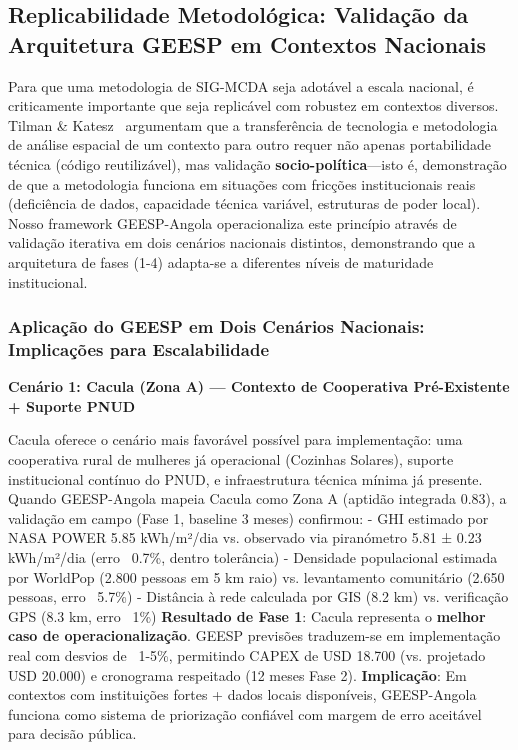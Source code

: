 \documentclass[12pt, a4paper]{article}
\begin{document}
\subsection{Replicabilidade Metodológica: Validação da Arquitetura GEESP em Contextos Nacionais}

Para que uma metodologia de SIG-MCDA seja adotável a escala nacional, é criticamente importante que seja replicável com robustez em contextos diversos. Tilman \& Katesz~\citep{Tilman2002} argumentam que a transferência de tecnologia e metodologia de análise espacial de um contexto para outro requer não apenas portabilidade técnica (código reutilizável), mas validação \textbf{socio-política}---isto é, demonstração de que a metodologia funciona em situações com fricções institucionais reais (deficiência de dados, capacidade técnica variável, estruturas de poder local). Nosso framework GEESP-Angola operacionaliza este princípio através de validação iterativa em dois cenários nacionais distintos, demonstrando que a arquitetura de fases (1-4) adapta-se a diferentes níveis de maturidade institucional.

\subsubsection{Aplicação do GEESP em Dois Cenários Nacionais: Implicações para Escalabilidade}

\textbf{Cenário 1: Cacula (Zona A) — Contexto de Cooperativa Pré-Existente + Suporte PNUD}

Cacula oferece o cenário mais favorável possível para implementação: uma cooperativa rural de mulheres já operacional (Cozinhas Solares), suporte institucional contínuo do PNUD, e infraestrutura técnica mínima já presente. Quando GEESP-Angola mapeia Cacula como Zona A (aptidão integrada 0.83), a validação em campo (Fase 1, baseline 3 meses) confirmou:
- GHI estimado por NASA POWER 5.85 kWh/m²/dia vs. observado via piranómetro 5.81 ± 0.23 kWh/m²/dia (erro ~0.7\%, dentro tolerância)
- Densidade populacional estimada por WorldPop (2.800 pessoas em 5 km raio) vs. levantamento comunitário (2.650 pessoas, erro ~5.7\%)
- Distância à rede calculada por GIS (8.2 km) vs. verificação GPS (8.3 km, erro ~1\%)
\textbf{Resultado de Fase 1}: Cacula representa o 
\textbf{melhor caso de operacionalização}. GEESP previsões traduzem-se em implementação real com desvios de ~1-5\%, permitindo CAPEX de USD 18.700 (vs. projetado USD 20.000) e cronograma respeitado (12 meses Fase 2).
\textbf{Implicação}: Em contextos com instituições fortes + dados locais disponíveis, GEESP-Angola funciona como sistema de priorização confiável com margem de erro aceitável para decisão pública.
\end{document}
